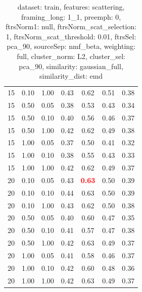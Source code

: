 \documentclass[12pt,a4paper,fleqn]{tufte-handout}
\begin{document}
\begin{table}
\begin{center}
\begin{tabular}{lllcccc}
15 & 0.10 & 1.00 & 0.43 & 0.62 & 0.51 & 0.38 \\                  
15 & 0.50 & 0.05 & 0.38 & 0.53 & 0.43 & 0.34 \\                  
15 & 0.50 & 0.10 & 0.40 & 0.56 & 0.46 & 0.37 \\                  
15 & 0.50 & 1.00 & 0.42 & 0.62 & 0.49 & 0.38 \\                  
15 & 1.00 & 0.05 & 0.37 & 0.50 & 0.41 & 0.32 \\                  
15 & 1.00 & 0.10 & 0.38 & 0.55 & 0.43 & 0.33 \\                  
15 & 1.00 & 1.00 & 0.42 & 0.62 & 0.49 & 0.37 \\                  
20 & 0.10 & 0.05 & 0.43 & \textbf{\textcolor{red}{0.63}} & 0.50 & 0.39 \\                  
20 & 0.10 & 0.10 & 0.44 & 0.63 & 0.50 & 0.39 \\                  
20 & 0.10 & 1.00 & 0.43 & 0.62 & 0.50 & 0.38 \\                  
20 & 0.50 & 0.05 & 0.40 & 0.60 & 0.47 & 0.35 \\                  
20 & 0.50 & 0.10 & 0.41 & 0.57 & 0.47 & 0.38 \\                  
20 & 0.50 & 1.00 & 0.42 & 0.63 & 0.49 & 0.37 \\                  
20 & 1.00 & 0.05 & 0.41 & 0.58 & 0.46 & 0.37 \\                  
20 & 1.00 & 0.10 & 0.42 & 0.60 & 0.48 & 0.36 \\                  
20 & 1.00 & 1.00 & 0.42 & 0.63 & 0.49 & 0.37 \\                  
\end{tabular}                  
\end{center}                  
\caption{dataset: train, features: scattering, framing\_long: 1\_1, preemph: 0, ftrsNorm1: null, ftrsNorm\_scat\_selection: 1, ftrsNorm\_scat\_threshold: 0.01, ftrsSel: pca\_90, sourceSep: nmf\_beta, weighting: full, cluster\_norm: L2, cluster\_sel: pca\_90, similarity: gaussian\_full, similarity\_dist: emd}                  
\label{datasetrFeaturscFraminlong1_1Preemp0Ftrsnorm1nuFtrsnoscatselect1Ftrsnoscatthresh0.01Ftrsselpc90SourcesepnmbeWeightfuClustenormL2Clusteselpc90SimilagafuSimiladistem}                  
\end{table}                  
 
\end{document}
